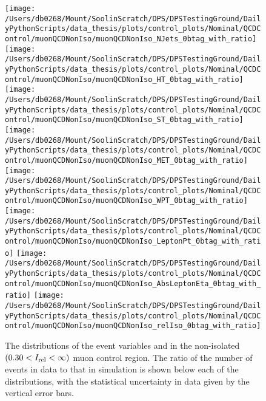 \begin{figure}[hp]
	\centering
	\texttt{[image: /Users/db0268/Mount/SoolinScratch/DPS/DPSTestingGround/DailyPythonScripts/data\_thesis/plots/control\_plots/Nominal/QCDControl/muonQCDNonIso/muonQCDNonIso\_NJets\_0btag\_with\_ratio]}
	\texttt{[image: /Users/db0268/Mount/SoolinScratch/DPS/DPSTestingGround/DailyPythonScripts/data\_thesis/plots/control\_plots/Nominal/QCDControl/muonQCDNonIso/muonQCDNonIso\_HT\_0btag\_with\_ratio]}
	\texttt{[image: /Users/db0268/Mount/SoolinScratch/DPS/DPSTestingGround/DailyPythonScripts/data\_thesis/plots/control\_plots/Nominal/QCDControl/muonQCDNonIso/muonQCDNonIso\_ST\_0btag\_with\_ratio]} \\
	\texttt{[image: /Users/db0268/Mount/SoolinScratch/DPS/DPSTestingGround/DailyPythonScripts/data\_thesis/plots/control\_plots/Nominal/QCDControl/muonQCDNonIso/muonQCDNonIso\_MET\_0btag\_with\_ratio]}
	\texttt{[image: /Users/db0268/Mount/SoolinScratch/DPS/DPSTestingGround/DailyPythonScripts/data\_thesis/plots/control\_plots/Nominal/QCDControl/muonQCDNonIso/muonQCDNonIso\_WPT\_0btag\_with\_ratio]} \\
	\texttt{[image: /Users/db0268/Mount/SoolinScratch/DPS/DPSTestingGround/DailyPythonScripts/data\_thesis/plots/control\_plots/Nominal/QCDControl/muonQCDNonIso/muonQCDNonIso\_LeptonPt\_0btag\_with\_ratio]} 
	\texttt{[image: /Users/db0268/Mount/SoolinScratch/DPS/DPSTestingGround/DailyPythonScripts/data\_thesis/plots/control\_plots/Nominal/QCDControl/muonQCDNonIso/muonQCDNonIso\_AbsLeptonEta\_0btag\_with\_ratio]}
	\texttt{[image: /Users/db0268/Mount/SoolinScratch/DPS/DPSTestingGround/DailyPythonScripts/data\_thesis/plots/control\_plots/Nominal/QCDControl/muonQCDNonIso/muonQCDNonIso\_relIso\_0btag\_with\_ratio]}
	\caption[The distributions of the event variables and \Irel{} in the non-isolated $(0.30 < \Irel < \infty )$ muon control region. The ratio of the number of events in data to that in simulation is shown below each of the distributions, with the statistical uncertainty in data given by the vertical error bars.]{The distributions of the event variables and \Irel{} in the non-isolated $(0.30 < \Irel < \infty )$ muon control region. The ratio of the number of events in data to that in simulation is shown below each of the distributions, with the statistical uncertainty in data given by the vertical error bars.}
	\label{fig:QCDmuNonIso}
\end{figure}
